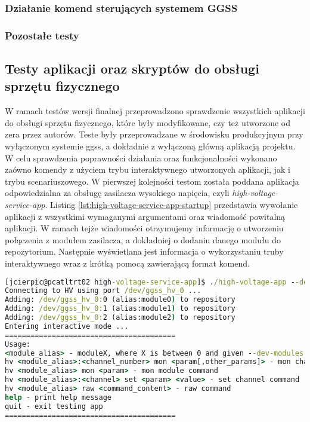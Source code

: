 \subsubsection*{Działanie komend sterujących systemem GGSS}


\subsubsection*{Pozostałe testy}
%





\clearpage
\subsection{Testy aplikacji oraz skryptów do obsługi sprzętu fizycznego}

W ramach testów wersji finalnej przeprowadzono sprawdzenie wszystkich aplikacji do obsługi sprzętu fizycznego, które były modyfikowane, czy też utworzone od zera przez autorów. Teste były przeprowadzane w środowisku produkcyjnym przy wyłączonym systemie ggss, a dokładnie z wyłączoną główną aplikacją projektu. W celu sprawdzenia poprawności działania oraz funkcjonalności wykonano zaówno komendy z użyciem trybu interaktywnego utworzonych aplikacji, jak i trybu scenariuszowego. W pierwszej kolejności testom została poddana aplikacja odpowiedzialna za obsługę zasilacza wysokiego napięcia, czyli \emph{high-voltage-service-app}. Listing \ref{lst:high-voltage-service-app-startup} przedstawia wywołanie aplikacji z wszystkimi wymaganymi argumentami oraz wiadomość powitalną aplikacji. W ramach tejże wiadomości otrzymujemy informację o utworzeniu połączenia z modułem zasilacza, a dokładniej o dodaniu danego modułu do repozytorium. Następnie wyświetlana jest informacja o wykorzystaniu truby interaktywnego wraz z krótką pomocą zawierającą format komend.

\begin{lstlisting}[language=cmd,caption={Uruchomienie aplikacji \emph{high-voltage-service-app} w trybie interaktywnym},label={lst:high-voltage-service-app-startup},frame=single]
[jcierpic@pcatltrt02 high-voltage-service-app]$ ./high-voltage-app --dev-port=/dev/ggss_hv_0 --dev-modules 3
Connecting to HV using port /dev/ggss_hv_0 ...
Adding: /dev/ggss_hv_0:0 (alias:module0) to repository
Adding: /dev/ggss_hv_0:1 (alias:module1) to repository
Adding: /dev/ggss_hv_0:2 (alias:module2) to repository
Entering interactive mode ...
========================================
Usage:
<module_alias> - moduleX, where X is between 0 and given --dev-modules exclusive
hv <module_alias>:<channel_number> mon <param[,other_params]> - mon channel command
hv <module_alias> mon <param> - mon module command
hv <module_alias>:<channel> set <param> <value> - set channel command
hv <module_alias> raw <command_content> - raw command
help - print help message
quit - exit testing app
========================================
\end{lstlisting}

